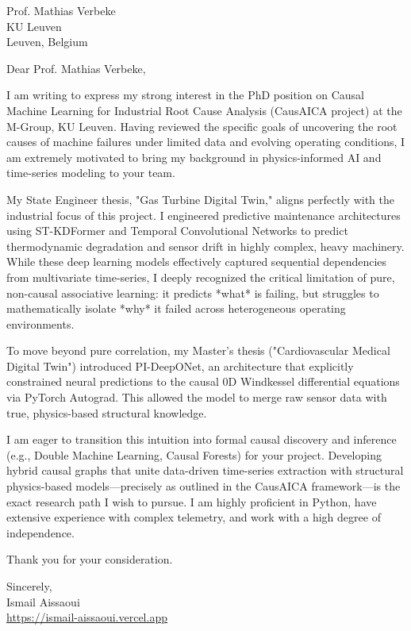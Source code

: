\documentclass[11pt, a4paper]{letter}
\begin{document}
\begin{letter}{Prof. Mathias Verbeke \\ KU Leuven \\ Leuven, Belgium}
\opening{Dear Prof. Mathias Verbeke,}

I am writing to express my strong interest in the PhD position on Causal Machine Learning for Industrial Root Cause Analysis (CausAICA project) at the M-Group, KU Leuven. Having reviewed the specific goals of uncovering the root causes of machine failures under limited data and evolving operating conditions, I am extremely motivated to bring my background in physics-informed AI and time-series modeling to your team.

My State Engineer thesis, "Gas Turbine Digital Twin," aligns perfectly with the industrial focus of this project. I engineered predictive maintenance architectures using ST-KDFormer and Temporal Convolutional Networks to predict thermodynamic degradation and sensor drift in highly complex, heavy machinery. While these deep learning models effectively captured sequential dependencies from multivariate time-series, I deeply recognized the critical limitation of pure, non-causal associative learning: it predicts *what* is failing, but struggles to mathematically isolate *why* it failed across heterogeneous operating environments.

To move beyond pure correlation, my Master's thesis ("Cardiovascular Medical Digital Twin") introduced PI-DeepONet, an architecture that explicitly constrained neural predictions to the causal 0D Windkessel differential equations via PyTorch Autograd. This allowed the model to merge raw sensor data with true, physics-based structural knowledge.

I am eager to transition this intuition into formal causal discovery and inference (e.g., Double Machine Learning, Causal Forests) for your project. Developing hybrid causal graphs that unite data-driven time-series extraction with structural physics-based models—precisely as outlined in the CausAICA framework—is the exact research path I wish to pursue. I am highly proficient in Python, have extensive experience with complex telemetry, and work with a high degree of independence.

Thank you for your consideration.

\closing{Sincerely, \\ Ismail Aissaoui \\ \href{https://ismail-aissaoui.vercel.app}{https://ismail-aissaoui.vercel.app}}
\end{letter}
\end{document}
